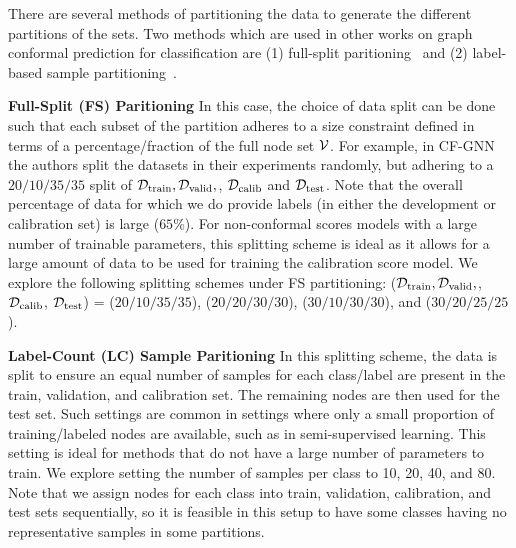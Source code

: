 There are several methods of partitioning the data to generate the different partitions of the sets. 
Two methods which are used in other works on graph conformal prediction for classification are (1) full-split paritioning~\cite{huang2024uncertainty} and (2) label-based sample partitioning~\cite{zargarbashi23conformal}.
 
\noindent \textbf{Full-Split (FS) Paritioning}
In this case, the choice of data split can be done such that each subset of the partition adheres to a size constraint defined in terms of a percentage/fraction of the full node set ${\mathcal{V}}$.
For example, in CF-GNN \cite{huang2024uncertainty} the authors split the datasets in their experiments randomly, but adhering to a $20/10/35/35$ split of ${\mathcal{D}}_{\text{train}}, {\mathcal{D}}_{\text{valid}},$, ${\mathcal{D}}_{\text{calib}}$ and  ${\mathcal{D}}_{\text{test}}$.
Note that the overall percentage of data for which we do provide labels (in either the development or calibration set) is large ($65\%$).
For non-conformal scores models with a large number of trainable parameters, this splitting scheme is ideal as it allows for a large amount of data to be used for training the calibration score  model.
We explore the following splitting schemes under FS partitioning:
(${\mathcal{D}}_{\text{train}}, {\mathcal{D}}_{\text{valid}},$, ${\mathcal{D}}_{\text{calib}}$, ${\mathcal{D}}_{\text{test}}$) = ($20/10/35/35$), ($20/20/30/30$), ($30/10/30/30$), and ($30/20/25/25$).

\noindent \textbf{Label-Count (LC) Sample Paritioning}
In this splitting scheme, the data is split to ensure an equal number of samples for each class/label are present in the train, validation, and calibration set.
The remaining nodes are then used for the test set.
Such settings are common in  settings where only a small proportion of training/labeled nodes are available, such as in semi-supervised learning.
This setting is ideal for methods that do not have a large number of parameters to train.
We explore setting the number of samples per class to 10, 20, 40, and 80.
Note that we assign nodes for each class into train, validation, calibration, and test sets sequentially, so it is feasible in this setup to have some classes having no representative samples in some partitions. 